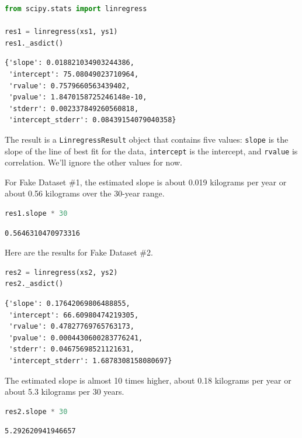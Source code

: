 \documentclass[
]{book}
\newcommand{\passthrough}[1]{#1}
\begin{document}
\begin{lstlisting}[language=Python]
from scipy.stats import linregress

res1 = linregress(xs1, ys1)
res1._asdict()
\end{lstlisting}

\begin{lstlisting}
{'slope': 0.018821034903244386,
 'intercept': 75.08049023710964,
 'rvalue': 0.7579660563439402,
 'pvalue': 1.8470158725246148e-10,
 'stderr': 0.002337849260560818,
 'intercept_stderr': 0.08439154079040358}
\end{lstlisting}

The result is a \passthrough{\lstinline!LinregressResult!} object that
contains five values: \passthrough{\lstinline!slope!} is the slope of
the line of best fit for the data, \passthrough{\lstinline!intercept!}
is the intercept, and \passthrough{\lstinline!rvalue!} is correlation.
We'll ignore the other values for now.

For Fake Dataset \#1, the estimated slope is about 0.019 kilograms per
year or about 0.56 kilograms over the 30-year range.

\begin{lstlisting}[language=Python]
res1.slope * 30
\end{lstlisting}

\begin{lstlisting}
0.5646310470973316
\end{lstlisting}

Here are the results for Fake Dataset \#2.

\begin{lstlisting}[language=Python]
res2 = linregress(xs2, ys2)
res2._asdict()
\end{lstlisting}

\begin{lstlisting}
{'slope': 0.17642069806488855,
 'intercept': 66.60980474219305,
 'rvalue': 0.47827769765763173,
 'pvalue': 0.0004430600283776241,
 'stderr': 0.04675698521121631,
 'intercept_stderr': 1.6878308158080697}
\end{lstlisting}

The estimated slope is almost 10 times higher, about 0.18 kilograms per
year or about 5.3 kilograms per 30 years.

\begin{lstlisting}[language=Python]
res2.slope * 30
\end{lstlisting}

\begin{lstlisting}
5.292620941946657
\end{lstlisting}
\end{document}
